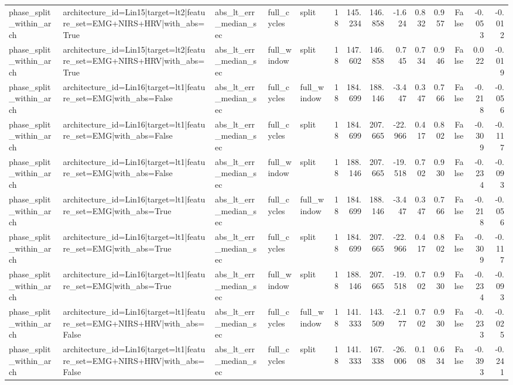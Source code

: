 \begin{table}
\begin{tabular}{lllllrrrrrrrrr}
phase_split_within_arch & architecture_id=Lin15|target=lt2|feature_set=EMG+NIRS+HRV|with_abs=True & abs_lt_err_median_sec & full_cycles & split & 18 & 145.234 & 146.858 & -1.624 & 0.832 & 0.957 & False & -0.053 & -0.012 \\
phase_split_within_arch & architecture_id=Lin15|target=lt2|feature_set=EMG+NIRS+HRV|with_abs=True & abs_lt_err_median_sec & full_window & split & 18 & 147.602 & 146.858 & 0.745 & 0.734 & 0.946 & False & 0.022 & -0.019 \\
phase_split_within_arch & architecture_id=Lin16|target=lt1|feature_set=EMG|with_abs=False & abs_lt_err_median_sec & full_cycles & full_window & 18 & 184.699 & 188.146 & -3.447 & 0.347 & 0.766 & False & -0.218 & -0.056 \\
phase_split_within_arch & architecture_id=Lin16|target=lt1|feature_set=EMG|with_abs=False & abs_lt_err_median_sec & full_cycles & split & 18 & 184.699 & 207.665 & -22.966 & 0.417 & 0.802 & False & -0.309 & -0.117 \\
phase_split_within_arch & architecture_id=Lin16|target=lt1|feature_set=EMG|with_abs=False & abs_lt_err_median_sec & full_window & split & 18 & 188.146 & 207.665 & -19.518 & 0.702 & 0.930 & False & -0.234 & -0.093 \\
phase_split_within_arch & architecture_id=Lin16|target=lt1|feature_set=EMG|with_abs=True & abs_lt_err_median_sec & full_cycles & full_window & 18 & 184.699 & 188.146 & -3.447 & 0.347 & 0.766 & False & -0.218 & -0.056 \\
phase_split_within_arch & architecture_id=Lin16|target=lt1|feature_set=EMG|with_abs=True & abs_lt_err_median_sec & full_cycles & split & 18 & 184.699 & 207.665 & -22.966 & 0.417 & 0.802 & False & -0.309 & -0.117 \\
phase_split_within_arch & architecture_id=Lin16|target=lt1|feature_set=EMG|with_abs=True & abs_lt_err_median_sec & full_window & split & 18 & 188.146 & 207.665 & -19.518 & 0.702 & 0.930 & False & -0.234 & -0.093 \\
phase_split_within_arch & architecture_id=Lin16|target=lt1|feature_set=EMG+NIRS+HRV|with_abs=False & abs_lt_err_median_sec & full_cycles & full_window & 18 & 141.333 & 143.509 & -2.177 & 0.702 & 0.930 & False & -0.233 & -0.025 \\
phase_split_within_arch & architecture_id=Lin16|target=lt1|feature_set=EMG+NIRS+HRV|with_abs=False & abs_lt_err_median_sec & full_cycles & split & 18 & 141.333 & 167.338 & -26.006 & 0.108 & 0.634 & False & -0.393 & -0.241 \\

\end{tabular}
\end{table}
